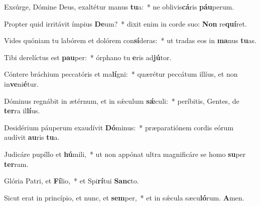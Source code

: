 \item Exsúrge, Dómine Deus, exaltétur manus \textbf{tu}a:~* ne oblivis\textbf{cá}ris \textbf{páu}perum.
\item Propter quid irritávit ímpius \textbf{De}um?~* dixit enim in corde suo: \textbf{Non} re\textbf{quí}ret.
\item Vides quóniam tu labórem et dolórem con\textbf{sí}deras:~* ut tradas eos in \textbf{ma}nus \textbf{tu}as.
\item Tibi derelíctus est \textbf{pau}per:~* órphano tu \textbf{e}ris ad\textbf{jú}tor.
\item Cóntere bráchium peccatóris et ma\textbf{lí}gni:~* quærétur peccátum illíus, et non in\textbf{ve}ni\textbf{é}tur.
\item Dóminus regnábit in ætérnum, et in sǽculum \textbf{sǽ}culi:~* períbitis, Gentes, de \textbf{ter}ra il\textbf{lí}us.
\item Desidérium páuperum exaudívit \textbf{Dó}minus:~* præparatiónem cordis eórum audívit \textbf{au}ris \textbf{tu}a.
\item Judicáre pupíllo et \textbf{hú}mili,~* ut non appónat ultra magnificáre se homo \textbf{su}per \textbf{ter}ram.
\item Glória Patri, et \textbf{Fí}lio,~* et Spi\textbf{rí}tui \textbf{Sanc}to.
\item Sicut erat in princípio, et nunc, et \textbf{sem}per,~* et in sǽcula sæcu\textbf{ló}rum. \textbf{A}men.
